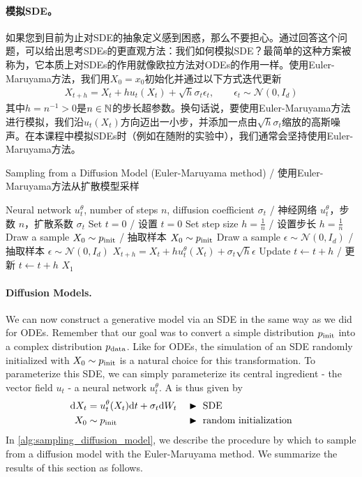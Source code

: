 \paragraph{模拟SDE。} 如果您到目前为止对SDE的抽象定义感到困惑，那么不要担心。通过回答这个问题，可以给出思考SDEs的更直观方法：我们如何模拟SDE？最简单的这种方案被称为，它本质上对SDEs的作用就像欧拉方法对ODEs的作用一样。使用Euler-Maruyama方法，我们用$X_0=x_0$初始化并通过以下方式迭代更新
\begin{align}
    X_{t+h} = X_{t}+hu_t(X_t) + \sqrt{h}\sigma_t\epsilon_t,\quad \quad \epsilon_t \sim \mathcal{N}(0,I_d)
\end{align}
其中$h=n^{-1}>0$是$n \in \mathbb N$的步长超参数。换句话说，要使用Euler-Maruyama方法进行模拟，我们沿$u_t(X_t)$方向迈出一小步，并添加一点由$\sqrt{h}\sigma_t$缩放的高斯噪声。在本课程中模拟SDEs时（例如在随附的实验中），我们通常会坚持使用Euler-Maruyama方法。

\begin{algorithm}[h]
\caption{Sampling from a Diffusion Model (Euler-Maruyama method) / 使用Euler-Maruyama方法从扩散模型采样}
\label{alg:sampling_diffusion_model}
\begin{algorithmic}[1]
\REQUIRE Neural network $u_t^\theta$, number of steps $n$, diffusion coefficient $\sigma_t$ / 神经网络 $u_t^\theta$，步数 $n$，扩散系数 $\sigma_t$
\STATE Set $t=0$ / 设置 $t=0$
\STATE Set step size $h=\frac{1}{n}$ / 设置步长 $h=\frac{1}{n}$
\STATE Draw a sample $X_0\sim p_{\rm{init}}$ / 抽取样本 $X_0\sim p_{\rm{init}}$
    \STATE Draw a sample $\epsilon\sim \mathcal{N}(0,I_d)$ / 抽取样本 $\epsilon\sim \mathcal{N}(0,I_d)$
    \STATE $X_{t+h} = X_{t} + h u_t^\theta(X_t)+\sigma_t\sqrt{h}\epsilon$
    \STATE Update $t\leftarrow t+h$ / 更新 $t\leftarrow t+h$
\ENDFOR
\RETURN $X_1$
\end{algorithmic}
\end{algorithm}

\paragraph{Diffusion Models.} We can now construct a generative model via an SDE in the same way as we did for ODEs. Remember that our goal was to convert a simple distribution $p_{\rm{init}}$ into a complex distribution $p_{\rm{data}}$. Like for ODEs, the simulation of an SDE randomly initialized with $X_0\sim p_{\rm{init}}$ is a natural choice for this transformation. To parameterize this SDE, we can simply parameterize its central ingredient - the vector field $u_t$ - a neural network $u_t^\theta$. A  is thus given by
\begin{align*}
    \mathrm{d} X_t &= u_t^\theta(X_t)\mathrm{d} t + \sigma_t \mathrm{d} W_t &&\blacktriangleright\,\,\text{SDE}\\
    X_0 &\sim p_{\rm{init}}  &&\blacktriangleright\,\,\text{random initialization}
    \end{align*}
In \cref{alg:sampling_diffusion_model}, we describe the procedure by which to sample from a diffusion model with the Euler-Maruyama method. We summarize the results of this section as follows.

